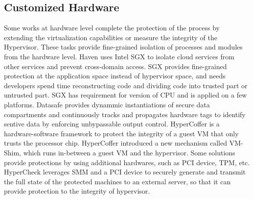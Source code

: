 \subsection{Customized Hardware }
Some works at hardware level complete the protection of the process by extending the virtualization capabilities or measure the integrity of the Hypervisor\cite{Moon2012Vigilare}\cite{Lee2013KI}\cite{azab2010hypersentry}\cite{rutkowska2008preventing}\cite{Wang2010HyperCheck}\cite{zhang2013hypercheck}\cite{azab2011sice}\cite{szefer2012architectural}. These tasks provide fine-grained isolation of processes and modules from the hardware level. Haven \cite{haven} uses Intel SGX\cite{Hoekstra13cuvillo,Mckeen2013Innovative} to isolate cloud services from other services and prevent cross-domain access. SGX provides fine-grained protection at the application space instead of hypervisor space, and needs developers spend time reconstructing code and dividing code into trusted part or untrusted part. SGX has requirement for version of CPU and is applied on a few platforms.
Datasafe\cite{chen2012software} provides dynammic instantiations of secure data compartments and continuously tracks and propagates hardware tags to identify sentive data by enforcing unbypassable output control.
HyperCoffer\cite{xia2013architecture} is a hardware-software framework to protect the integrity of a guest VM that only trusts the processor chip. HyperCoffer introduced a new mechanism called VM-Shim, which runs in-between a guest VM and the hypervisor.
Some solutions provide protections by using additional hardwares, such as PCI device, TPM, etc.  HyperCheck\cite{Wang2010HyperCheck} \cite{zhang2013hypercheck} leverages SMM and a PCI device to securely generate and transmit the full state of the protected machines to an external server, so that it can provide protection to the integrity of hypervisor. 

